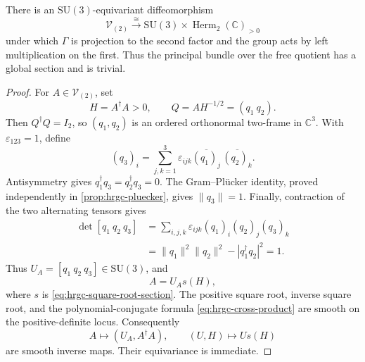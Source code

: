 \begin{theorem}
\label{thm:hrgc-free-trivialization}
There is an \(\mathrm{SU}(3)\)-equivariant diffeomorphism
\begin{equation}
 \mathscr V_{(2)}
 \xrightarrow{\ \cong\ }
 \mathrm{SU}(3)\times\operatorname{Herm}_2(\mathbb C)_{>0}
 \label{eq:hrgc-free-product}
\end{equation}
under which \(\Gamma\) is projection to the second factor and the group acts
by left multiplication on the first.  Thus the principal bundle over the
free quotient has a global section and is trivial.
\end{theorem}

\begin{proof}
For \(A\in\mathscr V_{(2)}\), set
\[
 H=A^\dagger A>0,
 \qquad Q=AH^{-1/2}=(q_1\ q_2).
\]
Then \(Q^\dagger Q=I_2\), so \((q_1,q_2)\) is an ordered orthonormal
two-frame in \(\mathbb C^3\).  With \(\varepsilon_{123}=1\), define
\begin{equation}
 (q_3)_i=\sum_{j,k=1}^3\varepsilon_{ijk}
 \overline{(q_1)_j}\,\overline{(q_2)_k}.
 \label{eq:hrgc-cross-product}
\end{equation}
Antisymmetry gives
\(q_1^\dagger q_3=q_2^\dagger q_3=0\).  The Gram--Pl\"ucker identity, proved
independently in \cref{prop:hrgc-pluecker}, gives \(\lVert q_3\rVert=1\).
Finally, contraction of the two alternating tensors gives
\begin{align*}
 \det[q_1\ q_2\ q_3]
 &=\sum_{i,j,k}\varepsilon_{ijk}(q_1)_i(q_2)_j(q_3)_k\\
 &=\lVert q_1\rVert^2\lVert q_2\rVert^2
   -|q_1^\dagger q_2|^2=1.
\end{align*}
Thus \(U_A=[q_1\ q_2\ q_3]\in\mathrm{SU}(3)\), and
\[
 A=U_A s(H),
\]
where \(s\) is \eqref{eq:hrgc-square-root-section}.  The positive square
root, inverse square root, and the polynomial-conjugate formula
\eqref{eq:hrgc-cross-product} are smooth on the positive-definite locus.
Consequently
\[
 A\longmapsto(U_A,A^\dagger A),
 \qquad
 (U,H)\longmapsto Us(H)
\]
are smooth inverse maps.  Their equivariance is immediate.
\end{proof}

